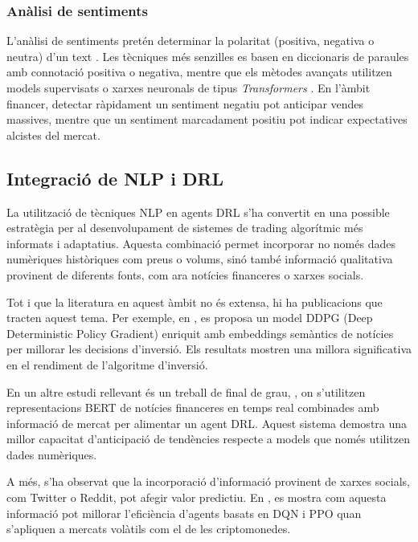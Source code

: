 \documentclass[12pt,a4paper,twoside]{book}
\begin{document}
\subsubsection{Anàlisi de sentiments}

L'anàlisi de sentiments pretén determinar la polaritat (positiva, negativa o neutra) d'un text \cite{kennedy2006sentiment}. Les tècniques més senzilles es basen en diccionaris de paraules amb connotació positiva o negativa, mentre que els mètodes avançats utilitzen models supervisats o xarxes neuronals de tipus \emph{Transformers} \cite{TABINDAKOKAB2022100157}. En l'àmbit financer, detectar ràpidament un sentiment negatiu pot anticipar vendes massives, mentre que un sentiment marcadament positiu pot indicar expectatives alcistes del mercat.


\subsection{Integració de NLP i DRL}

La utilització de tècniques NLP en agents DRL s'ha convertit en una possible estratègia per al desenvolupament de sistemes de trading algorítmic més informats i adaptatius. Aquesta combinació permet incorporar no només dades numèriques històriques com preus o volums, sinó també informació qualitativa provinent de diferents fonts, com ara notícies financeres o xarxes socials.

Tot i que la literatura en aquest àmbit no és extensa, hi ha publicacions que tracten aquest tema. Per exemple, en \cite{gangopadhyay}, es proposa un model DDPG (Deep Deterministic Policy Gradient) enriquit amb embeddings semàntics de notícies per millorar les decisions d'inversió. Els resultats mostren una millora significativa en el rendiment de l'algoritme d'inversió.

En un altre estudi rellevant és un treball de final de grau, \cite{alvarez2023real}, on s'utilitzen representacions BERT de notícies financeres en temps real combinades amb informació de mercat per alimentar un agent DRL. Aquest sistema demostra una millor capacitat d'anticipació de tendències respecte a models que només utilitzen dades numèriques.

A més, s'ha observat que la incorporació d'informació provinent de xarxes socials, com Twitter o Reddit, pot afegir valor predictiu. En \cite{DBLP}, es mostra com aquesta informació  pot millorar l'eficiència d'agents basats en DQN i PPO quan s'apliquen a mercats volàtils com el de les criptomonedes.
\end{document}
